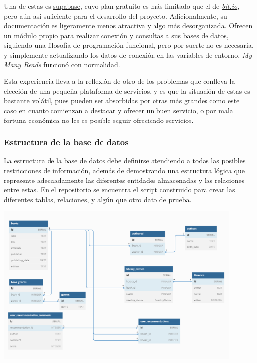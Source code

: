 Una de estas es \href{https://supabase.com/}{supabase}, cuyo plan gratuito es más limitado que el de \href{https://bit.io/}{\textit{bit.io}}, pero aún así suficiente para el desarrollo del proyecto. Adicionalmente, su documentación es ligeramente menos atractiva y algo más desorganizada. Ofrecen un módulo propio para realizar conexión y consultas a sus bases de datos, siguiendo una filosofía de programación funcional, pero por suerte no es necesaria, y simplemente actualizando los datos de conexión en las variables de entorno, \textit{My Many Reads} funcionó con normalidad.

Esta experiencia lleva a la reflexión de otro de los problemas que conlleva la elección de una pequeña plataforma de servicios, y es que la situación de estas es bastante volátil, pues pueden ser absorbidas por otras más grandes como este caso en cuanto comienzan a destacar y ofrecer un buen servicio, o por mala fortuna económica no les es posible seguir ofreciendo servicios.

\subsubsection{Estructura de la base de datos}

La estructura de la base de datos debe definirse atendiendo a todas las posibles restricciones de información, además de demostrando una estructura lógica que represente adecuadamente las diferentes entidades almacenadas y las relaciones entre estas. En el \href{https://github.com/Anglepi/My-Many-Reads/blob/main/scripts/init_db.sql}{repositorio} se encuentra el script construido para crear las diferentes tablas, relaciones, y algún que otro dato de prueba.

\includegraphics[width=0.9\textwidth]{img/diagrama_bd.png}\\[1.4cm]

